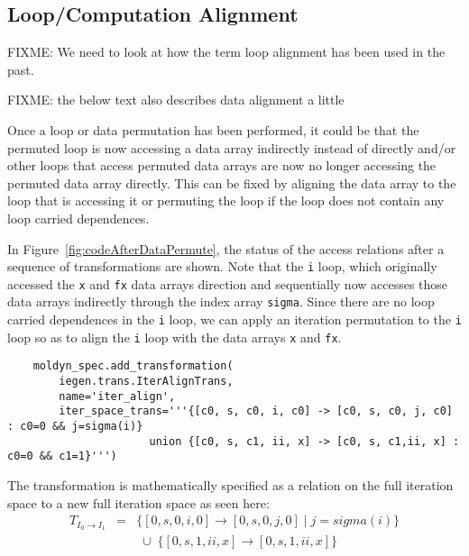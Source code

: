 \documentclass{article}
\begin{document}
\subsection{Loop/Computation Alignment}

FIXME: We need to look at how the term loop alignment has been used in the past.

FIXME: the below text also describes data alignment a little

Once a loop or data permutation has been performed, it could be that the permuted loop is now accessing a data array indirectly instead of directly and/or other loops that access permuted data arrays are now no longer accessing the permuted data array directly.  This can be fixed by aligning the data array to the loop that is accessing it or permuting the loop if the loop does not contain any loop carried dependences.


In Figure~\ref{fig:codeAfterDataPermute}, the status of the access relations after a sequence of transformations are shown.  Note that the {\tt i} loop, which originally accessed the {\tt x} and {\tt fx} data arrays direction and sequentially now accesses those data arrays indirectly through the index array {\tt sigma}.  Since there are no loop carried dependences in the {\tt i} loop, 
we can apply an iteration permutation to the {\tt i} loop so as to align the {\tt i} loop with the data arrays {\tt x} and {\tt fx}.
\begin{verbatim}
    moldyn_spec.add_transformation(
        iegen.trans.IterAlignTrans,
        name='iter_align',
        iter_space_trans='''{[c0, s, c0, i, c0] -> [c0, s, c0, j, c0] : c0=0 && j=sigma(i)}
                      union {[c0, s, c1, ii, x] -> [c0, s, c1,ii, x] : c0=0 && c1=1}''')
\end{verbatim}


The transformation is mathematically specified as a relation on the full
iteration space to a new full iteration space as seen here:
\[
\begin{array}{rcl}
	T_{I_0 \rightarrow I_1} & = & \{ [0, s, 0, i, 0 ] \rightarrow [ 0, s, 0, j, 0] \; | \; j = sigma(i)  \} \\
	& & \; \cup \; \{ [0, s, 1, ii, x ] \rightarrow [ 0, s, 1, ii, x]  \}
\end{array}
\]
\end{document}

